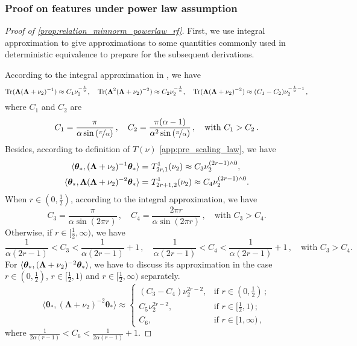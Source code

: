 \subsubsection{Proof on features under power law assumption}

\begin{proof}[Proof of \cref{prop:relation_minnorm_powerlaw_rf}]
First, we use integral approximation to give approximations to some quantities commonly used in deterministic equivalence to prepare for the subsequent derivations.

According to the integral approximation in \citet[Lemma 1]{simonmore}, we have
\begin{equation}\label{eq:integrate_approx1}
    {\rm Tr}({\boldsymbol \Lambda} ({\boldsymbol \Lambda} + \nu_2)^{-1}) \approx C_1 \nu_2^{-\frac{1}{\alpha}},\quad {\rm Tr}({\boldsymbol \Lambda}^2 ({\boldsymbol \Lambda} + \nu_2)^{-2}) \approx C_2 \nu_2^{-\frac{1}{\alpha}},\quad {\rm Tr}({\boldsymbol \Lambda} ({\boldsymbol \Lambda} + \nu_2)^{-2}) \approx (C_1-C_2) \nu_2^{-\frac{1}{\alpha}-1}\,,
\end{equation}
where $C_1$ and $C_2$ are
\begin{equation}\label{eq:C1C2}
    C_1 = \frac{\pi}{\alpha \sin\left(\nicefrac{\pi}{\alpha}\right)}\,,\quad C_2 = \frac{\pi(\alpha-1)}{\alpha^2 \sin\left(\nicefrac{\pi}{\alpha}\right)}\,,\quad \text{with $C_1 > C_2$}\,.
\end{equation}
Besides, according to definition of \(T(\nu)\) \cref{app:pre_scaling_law}, we have 
\[
\begin{aligned}
\langle {\boldsymbol \theta}_*, ({\boldsymbol \Lambda} + \nu_2)^{-1} {\boldsymbol \theta}_* \rangle =&~ T^1_{2r,1}(\nu_2) \approx C_3 \nu_2^{(2r-1)\wedge0},\\
\langle {\boldsymbol \theta}_*, {\boldsymbol \Lambda}({\boldsymbol \Lambda} + \nu_2)^{-2} {\boldsymbol \theta}_* \rangle =&~ T^1_{2r+1,2}(\nu_2) \approx C_4 \nu_2^{(2r-1)\wedge0}.\\
\end{aligned}
\]
When $r \in (0, \frac{1}{2})$, according to the integral approximation, we have
\begin{equation}
    C_3 = \frac{\pi}{\alpha \sin(2\pi r)}\,,\quad C_4 = \frac{2\pi r}{\alpha \sin(2\pi r)}\,,\quad \text{with $C_3 > C_4$}.
\end{equation}
Otherwise, if $r \in [\frac{1}{2}, \infty)$, we have
\[
\frac{1}{\alpha(2r-1)}< C_3 < \frac{1}{\alpha(2r-1)}+1\,,\quad \frac{1}{\alpha(2r-1)}< C_4 < \frac{1}{\alpha(2r-1)}+1\,,\quad \text{with $C_3 > C_4$}.
\]
For $\langle {\boldsymbol \theta}_*, ({\boldsymbol \Lambda} + \nu_2)^{-2} {\boldsymbol \theta}_* \rangle$, we have to discuss its approximation in the case $r \in (0, \frac{1}{2})$, $r \in [\frac{1}{2}, 1)$ and $r \in [\frac{1}{2}, \infty)$ separately.
\[
\langle \bm{\theta}_*, (\bm{\Lambda} + \nu_2)^{-2} \bm{\theta}_* \rangle \approx
\begin{cases} 
    (C_3 - C_4) \nu_2^{2r - 2}, & \text{if } r \in (0, \frac{1}{2})\,; \\
    C_5 \nu_2^{2r-2}, & \text{if } r \in [\frac{1}{2}, 1)\,; \\
    C_6, & \text{if } r \in [1, \infty)\,,
\end{cases}
\]
where $\frac{1}{2\alpha(r-1)} < C_6 < \frac{1}{2\alpha(r-1)} + 1$.



\end{proof}
